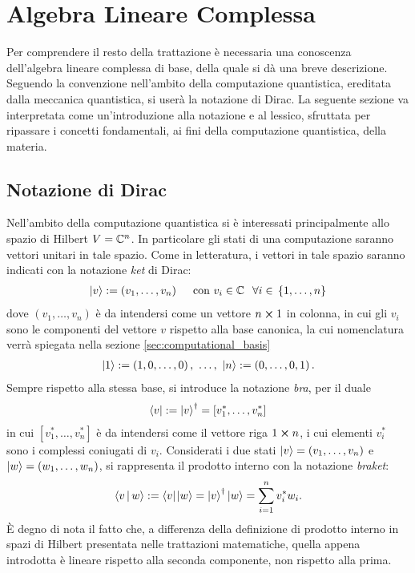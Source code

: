\section{Algebra Lineare Complessa}
Per comprendere il resto della trattazione è necessaria una conoscenza dell'algebra lineare complessa di base, della quale si dà una breve descrizione. 
Seguendo la convenzione nell'ambito della computazione quantistica, ereditata dalla meccanica quantistica, si userà la notazione di Dirac.
La seguente sezione va interpretata come un'introduzione alla notazione e al lessico, sfruttata per ripassare i concetti fondamentali, ai fini della computazione quantistica, della materia.

\subsection{Notazione di Dirac}
Nell'ambito della computazione quantistica si è interessati principalmente allo spazio di Hilbert $V = \mathbb{C}^{n}$.
In particolare gli stati di una computazione saranno vettori unitari in tale spazio. 
Come in letteratura, i vettori in tale spazio saranno indicati con la notazione \textit{ket} di Dirac:
\begin{align*}
 \ket{v} := \left(v_1, \dots, v_n\right) \quad \text{ con } v_i \in \mathbb{C}^{} \ \ \forall i \in \, \left\{1, \dots, n\right\}
\end{align*}
dove $\left(v_1, \dots, v_n\right)$ è da intendersi come un vettore $n \cross 1$ in colonna, in cui gli $v_i$ sono le componenti del vettore $v$ rispetto alla base canonica, la cui nomenclatura verrà spiegata nella sezione \ref{sec:computational_basis}
\begin{align*}
\ket{1} := \left(1, 0, \dots, 0\right),\ \dots,\ \ket{n} := \left(0, \dots, 0, 1\right).
\end{align*}
Sempre rispetto alla stessa base, si introduce la notazione \textit{bra}, per il duale
\begin{align*}
\bra{v} := \ket{v}^\dagger = [v_1^*, \dots, v_n^*]
\end{align*}
in cui $[v_1^*, \dots, v_n^*]$ è da intendersi come il vettore riga $1 \cross n$, i cui elementi $v_i^*$ sono i complessi coniugati di $v_i$.
Considerati i due stati ${\ket{v} = (v_1, \dots, v_n)}$ e ${\ket{w} = (w_1, \dots, w_n)}$, si rappresenta il prodotto interno con la notazione \textit{braket}:
\begin{align*}
 \braket{v\,}{\, w} := \bra{v} \;\!\! \ket{w} = \ket{v}^{\dagger} \ket{w} = \sum_{i=1}^n v_i^* w_i.
\end{align*}
È degno di nota il fatto che, a differenza della definizione di prodotto interno in spazi di Hilbert presentata nelle trattazioni matematiche, quella appena introdotta è lineare rispetto alla seconda componente, non rispetto alla prima.

